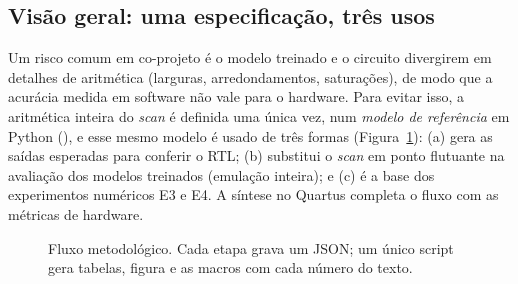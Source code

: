 \documentclass[12pt]{article}
\begin{document}
\subsection{Visão geral: uma especificação, três usos}
Um risco comum em co-projeto é o modelo treinado e o circuito divergirem em detalhes de aritmética (larguras, arredondamentos, saturações), de modo que a acurácia medida em software não vale para o hardware. Para evitar isso, a aritmética inteira do \emph{scan} é definida uma única vez, num \emph{modelo de referência} em Python (), e esse mesmo modelo é usado de três formas (Figura~\ref{fig:fluxo}): (a) gera as saídas esperadas para conferir o RTL; (b) substitui o \emph{scan} em ponto flutuante na avaliação dos modelos treinados (emulação inteira); e (c) é a base dos experimentos numéricos E3 e E4. A síntese no Quartus completa o fluxo com as métricas de hardware.

\begin{figure}[htb]
\centering
{}
\caption{Fluxo metodológico. Cada etapa grava um JSON; um único script gera tabelas, figura e as macros com cada número do texto.}
\label{fig:fluxo}
\end{figure}
\end{document}
